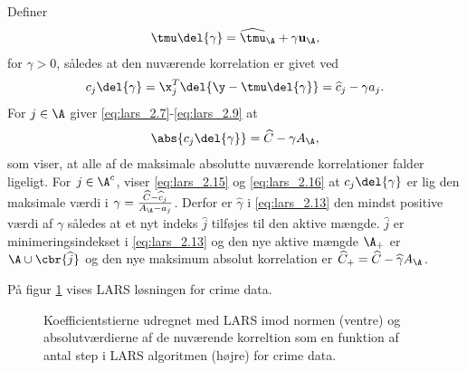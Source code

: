Definer
\begin{align}
\tmu \del{\gamma} = \widehat{\tmu}_\A + \gamma \mathbf{u}_\A, \label{eq:lars_2.14}
\end{align}
for \(\gamma > 0\), således at den nuværende korrelation er givet ved
\begin{align}
c_j \del{\gamma} = \x_j^T \del{\y - \tmu \del{\gamma}} = \widehat{c}_j - \gamma a_j. \label{eq:lars_2.15}
\end{align}
For \(j \in \A\) giver \eqref{eq:lars_2.7}-\eqref{eq:lars_2.9} at
\begin{align}
\abs{c_j \del{\gamma}} = \widehat{C} - \gamma A_\A,\label{eq:lars_2.16}
\end{align}
som viser, at alle af de maksimale absolutte nuværende korrelationer falder ligeligt.
For \(j \in \A^c\), viser \eqref{eq:lars_2.15} og \eqref{eq:lars_2.16} at \(c_j \del{\gamma}\) er lig den maksimale værdi i \(\gamma = \frac{\widehat{C} - \widehat{c}_j}{A_\A - a_j}\).
Derfor er \(\hat{\gamma}\) i \eqref{eq:lars_2.13} den mindst positive værdi af \(\gamma\) således at et nyt indeks \(\widehat{j}\) tilføjes til den aktive mængde.
\(\hat{j}\) er minimeringsindekset i \eqref{eq:lars_2.13} og den nye aktive mængde \(\A_+\) er \(\A \cup \cbr{\widehat{j}}\) og den nye maksimum absolut korrelation er \(\widehat{C}_+ = \widehat{C}- \widehat{\gamma} A_\A\).

På figur \ref{fig:crime_lar} vises LARS løsningen for crime data.
\begin{figure}[H]
\centering
{}
\caption{Koefficientstierne udregnet med LARS imod normen (ventre) og absolutværdierne af de nuværende korreltion som en funktion af antal step i LARS algoritmen (højre) for crime data.} \label{fig:crime_lar}
\end{figure}

